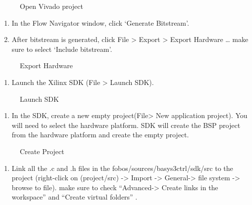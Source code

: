 \documentclass[letterpaper,10pt,english]{sphinxmanual}
\begin{document}
\begin{figure}[htbp]
\centering
\capstart

\noindent{}
\caption{Open Vivado project}\label{\detokenize{quickstart:id1}}\end{figure}
\begin{enumerate}
%
\setcounter{enumi}{2}
\item {} 
In the Flow Navigator window, click ‘Generate Bitstream’.

\item {} 
After bitstream is generated, click File \textgreater{} Export \textgreater{} Export Hardware … make sure to select ‘Include bitstream’.

\end{enumerate}

\begin{figure}[htbp]
\centering
\capstart

\noindent{}
\caption{Export Hardware}\label{\detokenize{quickstart:id2}}\end{figure}
\begin{enumerate}
%
\setcounter{enumi}{4}
\item {} 
Launch the Xilinx SDK (File \textgreater{} Launch SDK).

\end{enumerate}

\begin{figure}[htbp]
\centering
\capstart

\noindent{}
\caption{Launch SDK}\label{\detokenize{quickstart:id3}}\end{figure}
\begin{enumerate}
%
\setcounter{enumi}{5}
\item {} 
In the SDK, create a new empty project(File\textgreater{} New application project). You will need to select the hardware platform.
SDK will create the BSP project from the hardware platform and create the empty project.

\end{enumerate}

\begin{figure}[htbp]
\centering
\capstart

\noindent{}
\caption{Create Project}\label{\detokenize{quickstart:id4}}\end{figure}
\begin{enumerate}
%
\setcounter{enumi}{5}
\item {} 
Link all the .c and .h files in the fobos/sources/basys3ctrl/sdk/src to the project
(right-click on (project/src) -\textgreater{} Import -\textgreater{} General-\textgreater{} file system -\textgreater{} browse to file).
make sure to check “Advanced-\textgreater{} Create links in the workspace” and “Create virtual folders” .

\end{enumerate}
\end{document}
